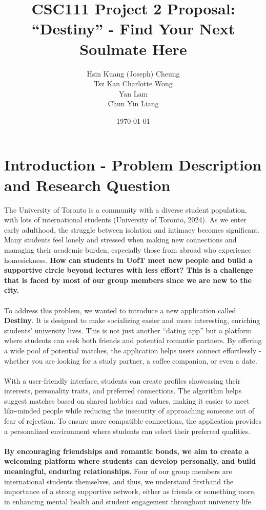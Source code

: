 \documentclass[fontsize=11pt]{article}
\title{CSC111 Project 2 Proposal: \\ \textbf{“Destiny” - Find Your Next Soulmate Here}}
\author{Hsin Kuang (Joseph) Cheung \\ Tsz Kan Charlotte Wong \\ Yan Lam \\ Chun Yin Liang}
\date{\today}
\begin{document}
\maketitle

\section*{Introduction - Problem Description and Research Question}

The University of Toronto is a community with a diverse student population, with lots of international students (University of Toronto, 2024).
As we enter early adulthood, the struggle between isolation and intimacy becomes significant.
Many students feel lonely and stressed when making new connections and managing their academic burden, especially those from abroad who experience homesickness.
\textbf{How can students in UofT meet new people and build a supportive circle beyond lectures with less effort?
This is a challenge that is faced by most of our group members since we are new to the city.}
\\
\\
To address this problem, we wanted to introduce a new application called \textbf{Destiny}.
It is designed to make socializing easier and more interesting, enriching students’ university lives.
This is not just another “dating app” but a platform where students can seek both friends and potential romantic partners. By offering a wide pool of potential matches, the application helps users connect effortlessly - whether you are looking for a study partner, a coffee companion, or even a date.
\\
\\
With a user-friendly interface, students can create profiles showcasing their interests, personality traits, and preferred connections.
The algorithm helps suggest matches based on shared hobbies and values, making it easier to meet like-minded people while reducing the insecurity of approaching someone out of fear of rejection. To ensure more compatible connections, the application provides a personalized environment where students can select their preferred qualities.
\\
\\
\textbf{By encouraging friendships and romantic bonds, we aim to create a welcoming platform where students can develop personally, and build meaningful, enduring relationships.}
Four of our group members are international students themselves, and thus, we understand firsthand the importance of a strong supportive network, either as friends or something more, in enhancing mental health and student engagement throughout university life.
\end{document}
